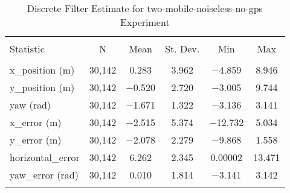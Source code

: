 
\begin{table}[h] \centering 
  \caption{Discrete Filter Estimate for two-mobile-noiseless-no-gps Experiment} 
  \label{tab:two_mobile_noiseless_no_gps_discrete_summary} 
\begin{tabular}{@{\extracolsep{5pt}}lccccc} 
\\[-1.8ex]\hline 
\hline \\[-1.8ex] 
Statistic & \multicolumn{1}{c}{N} & \multicolumn{1}{c}{Mean} & \multicolumn{1}{c}{St. Dev.} & \multicolumn{1}{c}{Min} & \multicolumn{1}{c}{Max} \\ 
\hline \\[-1.8ex] 
x\_position (m) & 30,142 & \num{0.283} & \num{3.962} & \num{-4.859} & \num{8.946} \\ 
y\_position (m) & 30,142 & \num{-0.520} & \num{2.720} & \num{-3.005} & \num{9.744} \\ 
yaw (rad) & 30,142 & \num{-1.671} & \num{1.322} & \num{-3.136} & \num{3.141} \\ 
x\_error (m) & 30,142 & \num{-2.515} & \num{5.374} & \num{-12.732} & \num{5.034} \\ 
y\_error (m) & 30,142 & \num{-2.078} & \num{2.279} & \num{-9.868} & \num{1.558} \\ 
horizontal\_error & 30,142 & \num{6.262} & \num{2.345} & \num{0.00002} & \num{13.471} \\ 
yaw\_error (rad) & 30,142 & \num{0.010} & \num{1.814} & \num{-3.141} & \num{3.142} \\ 
\hline \\[-1.8ex] 
\end{tabular} 
\end{table} 
